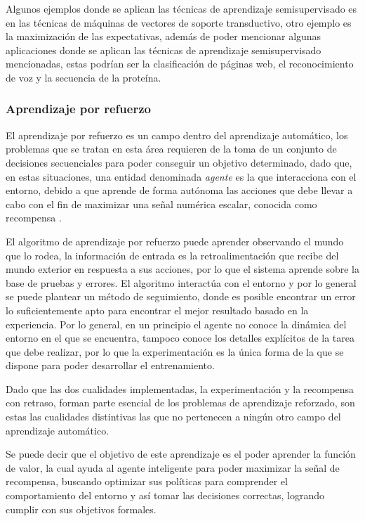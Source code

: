 Algunos ejemplos donde se aplican las técnicas de aprendizaje semisupervisado es en las técnicas de máquinas de vectores de soporte transductivo, otro ejemplo es la maximización de las expectativas, además de poder mencionar algunas aplicaciones donde se aplican las técnicas de aprendizaje semisupervisado mencionadas, estas podrían ser la clasificación de páginas web, el reconocimiento de voz y la secuencia de la proteína.


\subsubsection{Aprendizaje por refuerzo}

El aprendizaje por refuerzo es un campo dentro del aprendizaje automático, los problemas que se tratan en esta área requieren de la toma de un conjunto de decisiones secuenciales para poder conseguir un objetivo determinado, dado que, en estas situaciones, una entidad denominada \textit{agente} es la que interacciona con el entorno, debido a que aprende de forma autónoma las acciones que debe llevar a cabo con el fin de maximizar una señal numérica escalar, conocida como recompensa \cite{GuerraRamos2020}.

El algoritmo de aprendizaje por refuerzo puede aprender observando el mundo que lo rodea, la información de entrada es la retroalimentación que recibe del mundo exterior en respuesta a sus acciones, por lo que el sistema aprende sobre la base de pruebas y errores. El algoritmo interactúa con el entorno y por lo general se puede plantear un método de seguimiento, donde es posible encontrar un error lo suficientemente apto para encontrar el mejor resultado basado en la experiencia. Por lo general, en un principio el agente no conoce la dinámica del entorno en el que se encuentra, tampoco conoce los detalles explícitos de la tarea que debe realizar, por lo que la experimentación es la única forma de la que se dispone para poder desarrollar el entrenamiento.

Dado que las dos cualidades implementadas, la experimentación y la recompensa con retraso, forman parte esencial de los problemas de aprendizaje reforzado, son estas las cualidades distintivas las que no pertenecen a ningún otro campo del aprendizaje automático.

Se puede decir que el objetivo de este aprendizaje es el poder aprender la función de valor, la cual ayuda al agente inteligente para poder maximizar la señal de recompensa, buscando optimizar sus políticas para comprender el comportamiento del entorno y así tomar las decisiones correctas, logrando cumplir con sus objetivos formales. 

